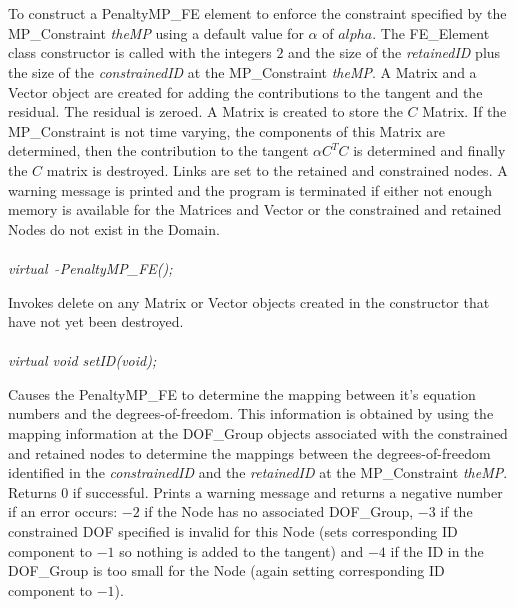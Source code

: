   \\
\\
To construct a PenaltyMP\_FE element to enforce the constraint
specified by the MP\_Constraint {\em theMP} using a default value for
$\alpha$ of $alpha$. The FE\_Element class constructor is called with
the integers $2$ and the size of the {\em retainedID} plus the size of
the {\em constrainedID} at the MP\_Constraint {\em theMP}. A Matrix
and a Vector object are created for adding the contributions to the
tangent and the residual. The residual is zeroed. A Matrix is created
to store the $C$ Matrix. If the MP\_Constraint is not time varying,
the components of this Matrix are determined, then the contribution
to the tangent $\alpha C^TC$ is determined and finally the $C$ matrix
is destroyed. Links are set to the retained and constrained nodes.
A warning message is printed and the program is terminated if
either not enough memory is available for the Matrices and Vector or the
constrained and retained Nodes do not exist in the Domain.  \\


  \\
{\em virtual~ $\tilde{}$PenaltyMP\_FE();}  

Invokes delete on any Matrix or Vector objects created in the
constructor that have not yet been destroyed. \\

  \\
{\em virtual void setID(void);} 

Causes the PenaltyMP\_FE to determine the mapping between it's equation
numbers and the degrees-of-freedom. This information is obtained by
using the mapping information at the DOF\_Group objects associated with
the constrained and retained nodes to determine the mappings between
the degrees-of-freedom identified in the {\em constrainedID} and the
{\em retainedID} at the MP\_Constraint {\em theMP}. Returns $0$ if
successful. Prints a warning message and returns a negative number if
an error occurs: $-2$ if the
Node has no associated DOF\_Group, $-3$ if the constrained DOF
specified is invalid for this Node (sets corresponding ID component to
$-1$ so nothing is added to the tangent) and $-4$ if the ID in the
DOF\_Group is too small for the Node (again setting corresponding ID
component to $-1$). \\ 


